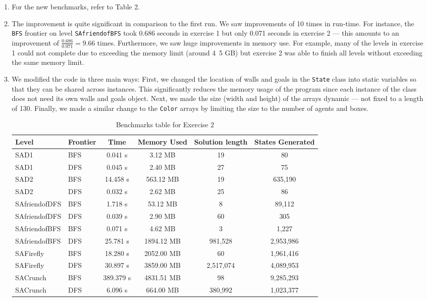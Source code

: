 \documentclass[12pt, letterpaper]{article}
\begin{document}
\begin{enumerate}[(1)]
\item
For the new benchmarks, refer to Table 2.


\item
The improvement is quite significant in comparison to the first run. We saw improvements of 10 times in run-time. For instance, the \texttt{BFS} frontier on level \texttt{SAfriendofBFS} took 0.686 seconds in exercise 1 but only 0.071 seconds in exercise 2 --- this amounts to an improvement of \( \frac{0.686}{0.071} = 9.66 \) times.
Furthermore, we saw huge improvements in memory use. For example, many of the levels in exercise 1 could not complete due to exceeding the memory limit (around 4~5 GB) but exercise 2 was able to finish all levels without exceeding the same memory limit. 


\item
We modified the code in three main ways: First, we changed the location of walls and goals in the \texttt{State} class into static variables so that they can be shared across instances. This significantly reduces the memory usage of the program since each instance of the class does not need its own walls and goals object. Next, we made the size (width and height) of the arrays dynamic --- not fixed to a length of 130. Finally, we made a similar change to the \texttt{Color} arrays by limiting the size to the number of agents and boxes. 


\begin{table}
\centering
\begin{tabular}{|l|l|c|c|c|c|}
\hline
\textbf{Level} & \textbf{Frontier} & \textbf{Time} & \textbf{Memory Used} & \textbf{Solution length} & \textbf{States Generated} \\
\hline 
SAD1 & BFS & 0.041 s & 3.12 MB & 19 & 80 \\
\hline
SAD1 & DFS & 0.045 s & 2.40 MB & 27 & 75 \\
\hline
SAD2 & BFS & 14.458 s & 563.12 MB & 19 & 635,190 \\
\hline
SAD2 & DFS  & 0.032 s & 2.62 MB & 25 & 86 \\
\hline
SAfriendofDFS & BFS  & 1.718 s & 53.12 MB & 8 & 89,112 \\
\hline
SAfriendofDFS & DFS & 0.039 s & 2.90 MB & 60 & 305 \\
\hline
SAfriendofBFS & BFS & 0.071 s & 4.62 MB & 3 & 1,227 \\
\hline
SAfriendofBFS & DFS & 25.781 s & 1894.12 MB & 981,528 & 2,953,986 \\
\hline
SAFirefly & BFS & 18.280 s & 2052.00 MB & 60 & 1,961,416 \\
\hline
SAFirefly & DFS & 30.897 s & 3859.00 MB & 2,517,074 & 4,089,953 \\
\hline
SACrunch & BFS & 389.379 s & 4831.51 MB & 98 & 9,285,293 \\
\hline
SACrunch & DFS & 6.096 s & 664.00 MB & 380,992 & 1,023,377 \\
\hline
\end{tabular}
\caption{Benchmarks table for Exercise 2}
\end{table}
\end{enumerate}
\end{document}
